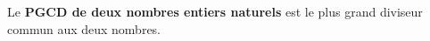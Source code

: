 
 Le \textbf{PGCD de deux nombres entiers naturels} est le plus grand diviseur commun aux deux nombres.